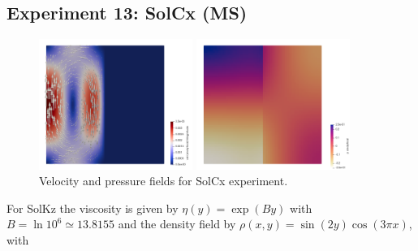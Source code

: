 \newpage
\subsection*{Experiment 13: SolCx (MS)}

\begin{figure}
\centering
\includegraphics[width=5cm]{python_codes/fieldstone_78/images/fields/vel_solcx}
\includegraphics[width=5cm]{python_codes/fieldstone_78/images/fields/press_solcx}\\
{\captionfont Velocity and pressure fields for SolCx experiment.}
\end{figure}

For SolKz the viscosity is given by $\eta(y)=\exp(By)$ with $B=\ln 10^6 \simeq 13.8155$ 
and the density field by $\rho(x,y)=\sin(2y) \cos(3\pi x)$, with 



